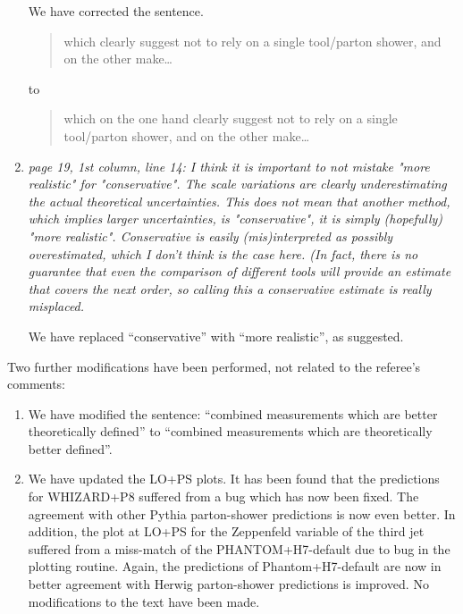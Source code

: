 \documentclass{report}
\begin{document}
\begin{enumerate}
We have corrected the sentence.
\begin{quote}
which clearly suggest not to rely on a single tool/parton shower, and on the other make\ldots
\end{quote}
to
\begin{quote}
which on the one hand clearly suggest not to rely on a single tool/parton shower, and on the other make\ldots
\end{quote}
    
\item \emph{page 19, 1st column, line 14:
I think it is important to not mistake "more realistic" for "conservative". The
scale variations are clearly underestimating the actual theoretical uncertainties. This does not mean that another method, which implies larger uncertainties, is "conservative", it is simply (hopefully) "more realistic". Conservative is easily (mis)interpreted as possibly overestimated, which I don't think is the case here. (In fact, there is no guarantee that even the comparison of different tools will provide an estimate that covers the next order, so calling this a conservative estimate is really misplaced.}

We have replaced ``conservative'' with ``more realistic'', as suggested.

\end{enumerate}
\vspace{1cm}
Two further modifications have been performed, not related to the referee's comments:
\begin{enumerate}
\item We have modified the sentence:
``combined measurements which are better theoretically defined'' to ``combined measurements which are theoretically better defined''.

\item We have updated the LO+PS plots.
It has been found that the predictions for WHIZARD+P8 suffered from a bug which has now been fixed.
The agreement with other Pythia parton-shower predictions is now even better.
In addition, the plot at LO+PS for the Zeppenfeld variable of the third jet suffered from a miss-match of the PHANTOM+H7-default due to bug in the plotting routine.
Again, the predictions of Phantom+H7-default are now in better agreement with Herwig parton-shower predictions is improved.
No modifications to the text have been made.

\end{enumerate}
\end{document}
